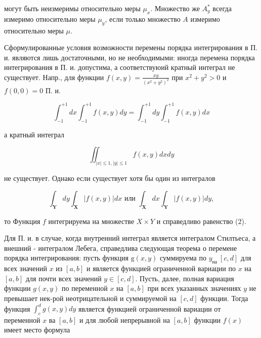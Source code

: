 \documentclass[10pt]{article}
\begin{document}
могут быть неизмеримы относительно меры $\mu_{x}$. Множество же $A_{y}^{*}$ всегда измеримо относительно меры $\mu_{y}$, если только множество $A$ измеримо относительно меры $\mu$.



Сформулированные условия возможности перемены порядка интегрирования в П. и. являются лишь достаточными, но не необходимыми: иногда перемена порядка интегрирования в П. и. допустима, а соответствуюий кратный интеграл не существует. Напр., для функции $f(x, y)=\frac{x y}{\left(x^{2}+y^{2}\right)^{2}}$ при $x^{2}+y^{2}>0$ и $f(0,0)=0$ П. и.



\[

\int_{-1}^{+1} d x \int_{-1}^{+1} f(x, y) d y=\int_{-1}^{+1} d y \int_{-1}^{+1} f(x, y) d x

\]



а кратный интеграл



\[

\iint_{|x| \leqslant 1,|y| \leqslant 1} f(x, y) d x d y

\]



не существует. Однако если существует хотя бы один из интегралов



\[

\int_{\boldsymbol{Y}} d y \int_{\boldsymbol{X}}|f(x, y)| d x \text { или } \int_{\boldsymbol{X}} d x \int_{\boldsymbol{Y}}|f(x, y)| d y,

\]



то Функция $f$ интегрируема на множестве $X \times Y$ и справедливо равенство (2).



Для П. и. в случае, когда внутренний интеграл является интегралом Стилтьеса, а внешний - интегралом Лебега, справедлива следующая теорема о перемене порядка интегрирования: пусть функция $\mathrm{g}(x, y)$ суммируема по $y_{\text {на }}[c, d]$ для всех значений $x$ из $[a, b]$ и является функцией ограниченной вариации по $x$ на $[a, b]$ для почти всех значений $y \in[c, d]$. Пусть, далее, полная вариация функции $g(x, y)$ по переменной $x$ на $[a, b]$ при всех указанных значениях $y$ не превышает нек-рой неотрицательной и суммируемой на $[c, d]$ функции. Тогда функция $\int_{c}^{d} g(x, y) d y$ является функцией ограниченной вариации от переменной $x$ ва $[a, b]$ и для любой непрерывной на $[a, b]$ функции $f(x)$ имеет место формула
\end{document}
